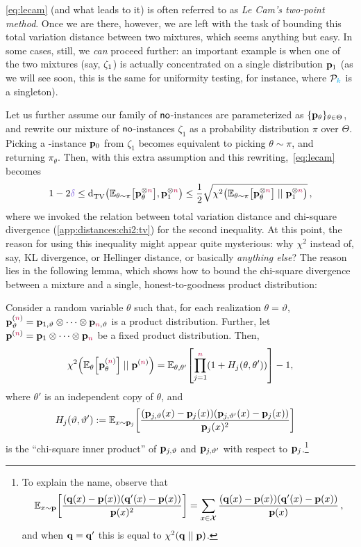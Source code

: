 \cref{eq:lecam} (and what leads to it) is often referred to as \emph{Le Cam's two-point method}. Once we are there, however, we are left with the task of bounding this total variation distance between two mixtures, which seems anything but easy. In some cases, still, we \emph{can} proceed further: an important example is when one of the two mixtures (say, $\zeta_1$) is actually concentrated on a single distribution $\mathbf{p}_1$ (as we will see soon, this is the same for uniformity testing, for instance, where $\mathcal{P}_{\textcolor{cyan}{k}}$ is a singleton). 

Let us further assume our family of ${\sf{}no}$-instances are parameterized as $\{\mathbf{p}_\theta\}_{\theta\in\Theta}$, and rewrite our mixture of ${\sf{}no}$-instances $\zeta_1$ as a probability distribution $\pi$ over $\Theta$. Picking a \no-instance $\mathbf{p}_0$ from $\zeta_1$ becomes equivalent to picking $\theta\sim\pi$, and returning $\pi_\theta$. Then, with this extra assumption and this rewriting,~\cref{eq:lecam} becomes
\begin{equation}
	\label{eq:lecam:simpler}
	1-2\errprob \leq \totalvardist{\bE{\theta\sim\pi}{\p_\theta^{\otimes\ns}}}{\p_\accept^{\otimes\ns}}
	\leq \frac{1}{2}\sqrt{\chisquare{\bE{\theta\sim\pi}{\p_\theta^{\otimes\ns}}}{\p_\accept^{\otimes\ns}}}\,,
\end{equation}
where we invoked the relation between total variation distance and chi-square divergence (\cref{app:distances:chi2:tv}) for the second inequality. At this point, the reason for using this inequality might appear quite mysterious: why $\chi^2$ instead of, say, KL divergence, or Hellinger distance, or basically \emph{anything else}? The reason lies in the following lemma, which shows how to bound the chi-square divergence between a mixture and a single, honest-to-goodness product distribution:
\begin{lemma}
	\label{lem:ingster}
Consider a random variable $\theta$ such that, for each realization
$\theta=\vartheta$, $\mathbf{p}_\vartheta^{({\textcolor{purple}{n}})}=\mathbf{p}_{1,\vartheta} \otimes \dots \otimes \mathbf{p}_{{\textcolor{purple}{n}},\vartheta}$ is a product distribution. Further, let
$\mathbf{p}^{({\textcolor{purple}{n}})} = \mathbf{p}_1 \otimes \dots \otimes \mathbf{p}_{\textcolor{purple}{n}}$ be a fixed product
distribution. Then,
\[
\chisquare{\bE{\theta}{\p_\theta^{(\ns)}} }{ \p^{(\ns)} } = \bE{\theta,\theta'}{\prod_{j=1}^\ns (1+{H_j(\theta,\theta')})} - 1,
\]
where $\theta'$ is an independent copy of $\theta$, and
\begin{align*}
H_{j}(\vartheta,\vartheta') &\eqdef \bE{x\sim\p_j}{\frac{(\p_{j,\vartheta}(x)-\p_j(x))(\p_{j,\vartheta'}(x)-\p_j(x))}{\p_j(x)^2}}%
\end{align*}
is the ``chi-square inner product'' of $\mathbf{p}_{j,\vartheta}$ and $\mathbf{p}_{j,\vartheta'}$ with respect to $\mathbf{p}_j$.\footnote{To explain the name, observe that
\[
\bE{x\sim\p}{\frac{(\q(x)-\p(x))(\q'(x)-\p(x))}{\p(x)^2}}=\sum_{x\in\domain} \frac{(\q(x)-\p(x))(\q'(x)-\p(x))}{\p(x)}\,,
\] and when $\mathbf{q}=\mathbf{q}'$ this is equal to $\chisquare{\q}{\p}$.}
\end{lemma}
